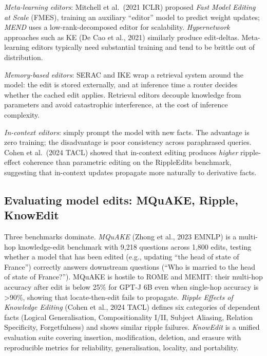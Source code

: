 \documentclass{article}
\begin{document}
\emph{Meta-learning editors}: Mitchell et al.~(2021 ICLR) proposed \emph{Fast Model Editing at Scale} (FMES), training an auxiliary ``editor'' model to predict weight updates; \emph{MEND} \citep{mitchell2022fastmodeleditingat} uses a low-rank-decomposed editor for scalability. \emph{Hypernetwork} approaches such as KE (De Cao et al., 2021) similarly produce edit-deltas. Meta-learning editors typically need substantial training and tend to be brittle out of distribution.

\emph{Memory-based editors}: SERAC \citep{mitchell2022fastmodeleditingat} and IKE \citep{zheng2024attentionheadsofla} wrap a retrieval system around the model: the edit is stored externally, and at inference time a router decides whether the cached edit applies. Retrieval editors decouple knowledge from parameters and avoid catastrophic interference, at the cost of inference complexity.

\emph{In-context editors}: simply prompt the model with new facts. The advantage is zero training; the disadvantage is poor consistency across paraphrased queries. Cohen et al.~(2024 TACL) showed that in-context editing produces \emph{higher} ripple-effect coherence than parametric editing on the RippleEdits benchmark, suggesting that in-context updates propagate more naturally to derivative facts.

\subsection{Evaluating model edits: MQuAKE, Ripple, KnowEdit}\label{evaluating-model-edits-mquake-ripple-knowedit}

Three benchmarks dominate. \emph{MQuAKE} (Zhong et al., 2023 EMNLP) is a multi-hop knowledge-edit benchmark with 9,218 questions across 1,800 edits, testing whether a model that has been edited (e.g., updating ``the head of state of France'') correctly answers downstream questions (``Who is married to the head of state of France?''). MQuAKE is hostile to ROME and MEMIT: their multi-hop accuracy after edit is below 25\% for GPT-J 6B even when single-hop accuracy is \textgreater90\%, showing that locate-then-edit fails to propagate. \emph{Ripple Effects of Knowledge Editing} (Cohen et al., 2024 TACL) defines six categories of dependent facts (Logical Generalisation, Compositionality I/II, Subject Aliasing, Relation Specificity, Forgetfulness) and shows similar ripple failures. \emph{KnowEdit} \citep{zhang2024acomprehensivestud} is a unified evaluation suite covering insertion, modification, deletion, and erasure with reproducible metrics for reliability, generalisation, locality, and portability.
\end{document}
